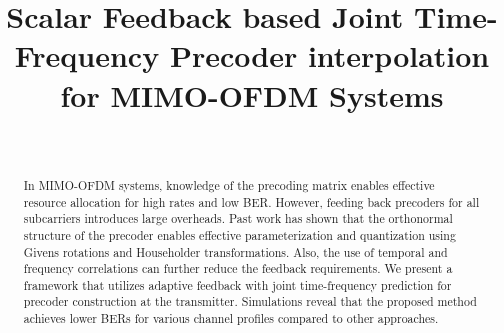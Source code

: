 \documentclass[journal,10pt,twocolumn]{IEEEtran}
\begin{document}

\title{Scalar Feedback based Joint Time-Frequency Precoder
  interpolation for  MIMO-OFDM Systems}



 \author{
 \
}
\maketitle

\thispagestyle{plain}



\begin{abstract}

  In MIMO-OFDM systems, knowledge of the precoding matrix enables
  effective resource allocation for high rates and low BER. However,
  feeding back precoders for all subcarriers introduces large
  overheads. Past work has shown that the orthonormal structure of the
  precoder enables effective parameterization and quantization using
  Givens rotations and Householder transformations. Also, the
  use of temporal and frequency correlations can further reduce the
  feedback requirements. We present a framework that utilizes
  adaptive feedback with joint time-frequency prediction for precoder
  construction at the transmitter.  Simulations reveal that the
  proposed method achieves lower BERs for various channel profiles
  compared to other approaches.
\end{abstract}
\end{document}

